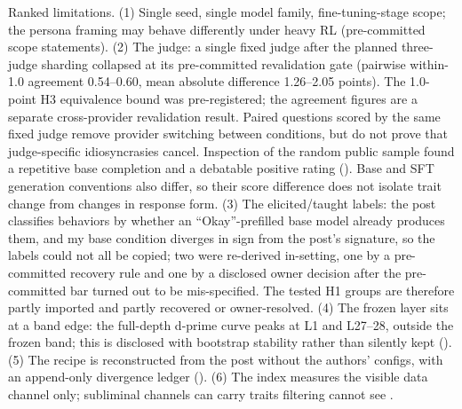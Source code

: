Ranked limitations. (1) Single seed, single model family,
fine-tuning-stage scope; the persona framing may behave differently under
heavy RL (pre-committed scope statements). (2) The judge: a single fixed judge
after the planned three-judge sharding collapsed at its pre-committed
revalidation gate (pairwise within-1.0 agreement 0.54--0.60, mean absolute
difference 1.26--2.05 points). The 1.0-point H3 equivalence bound was
pre-registered; the agreement figures are a separate cross-provider
revalidation result. Paired questions scored by the same fixed judge remove
provider switching between conditions, but do not prove that judge-specific
idiosyncrasies cancel. Inspection of the random public sample found a repetitive
base completion and a debatable positive  rating
(). Base and SFT generation conventions also differ, so their
score difference does not isolate trait change from changes in response form.
(3) The elicited/taught labels: the post classifies behaviors
by whether an ``Okay''-prefilled base model already produces them, and my
base condition diverges in sign from the post's signature, so the labels
could not all be copied; two were re-derived in-setting, one by a
pre-committed recovery rule and one by a disclosed owner decision after the
pre-committed bar turned out to be mis-specified. The tested H1 groups are
therefore partly imported and partly recovered or owner-resolved. (4) The
frozen layer sits at a band edge: the full-depth d-prime curve peaks at L1
and L27--28, outside the frozen band; this is disclosed with bootstrap
stability rather than silently kept (). (5) The recipe
is reconstructed from the post without the authors' configs, with an
append-only divergence ledger (). (6) The index measures
the visible data channel only; subliminal channels can carry traits
filtering cannot see \citep{cloud2025subliminal}.
